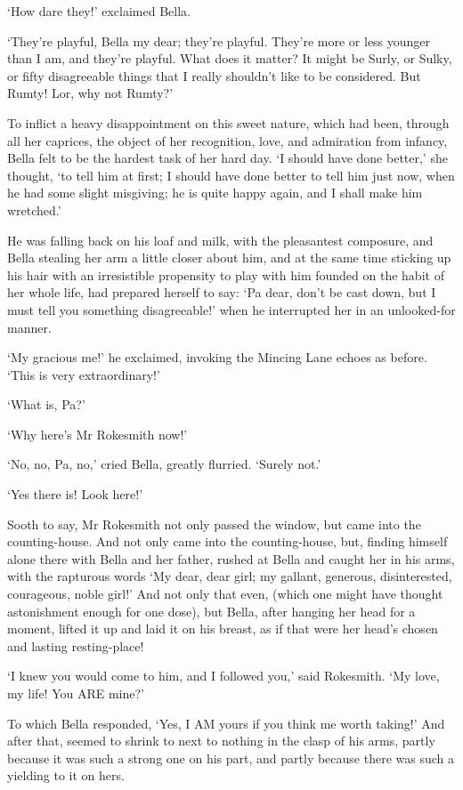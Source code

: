 ‘How dare they!’ exclaimed Bella.

‘They’re playful, Bella my dear; they’re playful. They’re more or less
younger than I am, and they’re playful. What does it matter? It might
be Surly, or Sulky, or fifty disagreeable things that I really shouldn’t
like to be considered. But Rumty! Lor, why not Rumty?’

To inflict a heavy disappointment on this sweet nature, which had been,
through all her caprices, the object of her recognition, love, and
admiration from infancy, Bella felt to be the hardest task of her hard
day. ‘I should have done better,’ she thought, ‘to tell him at first;
I should have done better to tell him just now, when he had some slight
misgiving; he is quite happy again, and I shall make him wretched.’

He was falling back on his loaf and milk, with the pleasantest
composure, and Bella stealing her arm a little closer about him, and at
the same time sticking up his hair with an irresistible propensity
to play with him founded on the habit of her whole life, had prepared
herself to say: ‘Pa dear, don’t be cast down, but I must tell you
something disagreeable!’ when he interrupted her in an unlooked-for
manner.

‘My gracious me!’ he exclaimed, invoking the Mincing Lane echoes as
before. ‘This is very extraordinary!’

‘What is, Pa?’

‘Why here’s Mr Rokesmith now!’

‘No, no, Pa, no,’ cried Bella, greatly flurried. ‘Surely not.’

‘Yes there is! Look here!’

Sooth to say, Mr Rokesmith not only passed the window, but came into the
counting-house. And not only came into the counting-house, but, finding
himself alone there with Bella and her father, rushed at Bella and
caught her in his arms, with the rapturous words ‘My dear, dear girl; my
gallant, generous, disinterested, courageous, noble girl!’ And not only
that even, (which one might have thought astonishment enough for one
dose), but Bella, after hanging her head for a moment, lifted it up and
laid it on his breast, as if that were her head’s chosen and lasting
resting-place!

‘I knew you would come to him, and I followed you,’ said Rokesmith. ‘My
love, my life! You ARE mine?’

To which Bella responded, ‘Yes, I AM yours if you think me worth
taking!’ And after that, seemed to shrink to next to nothing in the
clasp of his arms, partly because it was such a strong one on his part,
and partly because there was such a yielding to it on hers.

